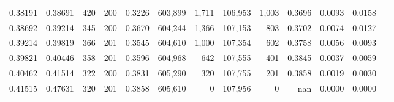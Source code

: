 \begin{tabular}{rrrrrrrrrrrrr}
0.38191 & 0.38691 &   420 & 200 &                                     0.3226 & 603,899 &   1,711 & 106,953 &   1,003 & 0.3696 & 0.0093 & 0.0158 \\
0.38692 & 0.39214 &   345 & 200 &                                     0.3670 & 604,244 &   1,366 & 107,153 &     803 & 0.3702 & 0.0074 & 0.0127 \\
0.39214 & 0.39819 &   366 & 201 &                                     0.3545 & 604,610 &   1,000 & 107,354 &     602 & 0.3758 & 0.0056 & 0.0093 \\
0.39821 & 0.40446 &   358 & 201 &                                     0.3596 & 604,968 &     642 & 107,555 &     401 & 0.3845 & 0.0037 & 0.0059 \\
0.40462 & 0.41514 &   322 & 200 &                                     0.3831 & 605,290 &     320 & 107,755 &     201 & 0.3858 & 0.0019 & 0.0030 \\
0.41515 & 0.47631 &   320 & 201 &                                     0.3858 & 605,610 &       0 & 107,956 &       0 &    nan & 0.0000 & 0.0000 \\
\bottomrule
\end{tabular}
